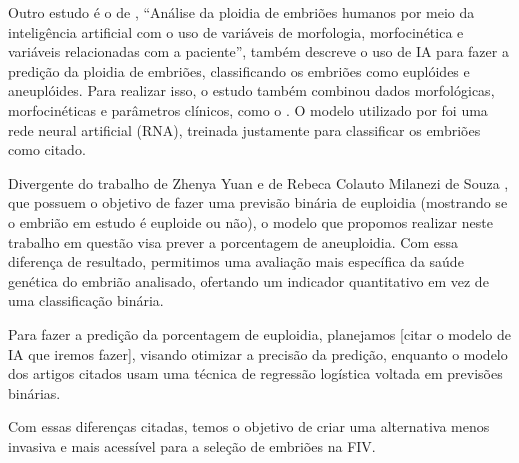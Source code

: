 Outro estudo é o de , “Análise da ploidia de embriões humanos por meio da inteligência artificial com o uso de variáveis de morfologia, morfocinética e variáveis relacionadas com a paciente”, também descreve o uso de IA para fazer a predição da ploidia de embriões, classificando os embriões como euplóides e aneuplóides. Para realizar isso, o estudo também combinou dados morfológicas, morfocinéticas e parâmetros clínicos, como o . O modelo utilizado por foi uma rede neural artificial (RNA), treinada justamente para classificar os embriões como citado.

Divergente do trabalho de Zhenya Yuan \cite{yuan2023} e de Rebeca Colauto Milanezi de Souza \cite{souzarebeca2022}, que possuem o objetivo de fazer uma previsão binária de euploidia (mostrando se o embrião em estudo é euploide ou não), o modelo que propomos realizar neste trabalho em questão visa prever a porcentagem de aneuploidia. Com essa diferença de resultado, permitimos uma avaliação mais específica da saúde genética do embrião analisado, ofertando um indicador quantitativo em vez de uma classificação binária.

Para fazer a predição da porcentagem de euploidia, planejamos [citar o modelo de IA que iremos fazer], visando otimizar a precisão da predição, enquanto o modelo dos artigos citados usam uma técnica de regressão logística voltada em previsões binárias.

Com essas diferenças citadas, temos o objetivo de criar uma alternativa menos invasiva e mais acessível para a seleção de embriões na FIV.
